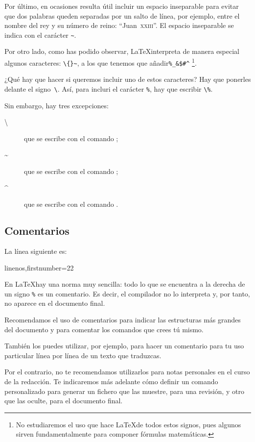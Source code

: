  Por último, en ocasiones resulta útil incluir un espacio inseparable para evitar que dos palabras queden separadas por un salto de línea, por ejemplo, entre el nombre del rey y su número de reino: \enquote{Juan~\textsc{xxiii}}.  El espacio inseparable se indica con el carácter \verb|~|.

Por otro lado, como has podido observar, \LaTeX interpreta de manera especial algunos caracteres: \verb|\{}~|, a los que tenemos que añadir\verb|%_&$#^| \footnote{No estudiaremos el uso que hace \LaTeX de todos estos signos, pues algunos sirven fundamentalmente para componer fórmulas matemáticas.}.

¿Qué hay que hacer si queremos incluir uno de estos caracteres? Hay que ponerles delante el signo~\verb|\|. Así, para incluri el carácter \verb|%|, hay que escribir \verb|\%|. 

Sin embargo, hay tres excepciones:
\begin{description}
\item[\textbackslash] que se escribe con el comando  ;
\item[\textasciitilde] que se escribe con el comando  ; 
\item[\textasciicircum] que se escribe con el comando . 
\end{description} 
\subsection{Comentarios}

La línea siguiente es: 
\begin{latexcode*}{linenos,firstnumber=22}
\end{latexcode*}

En \LaTeX hay una norma muy sencilla: todo lo que se encuentra a la derecha de un signo \verb|%| es un comentario.
Es decir, el compilador no lo interpreta y, por tanto, no aparece en el documento final. 

Recomendamos el uso de comentarios para indicar las estructuras más grandes del documento y para comentar los comandos que crees tú mismo. 

También los puedes utilizar, por ejemplo, para hacer un comentario para tu uso particular línea por línea de un texto que traduzcas.

Por el contrario, no te recomendamos utilizarlos para notas personales en el curso de la redacción. Te indicaremos más adelante cómo definir un comando personalizado para generar un fichero que las muestre, para una revisión, y otro que las oculte, para el documento final.



